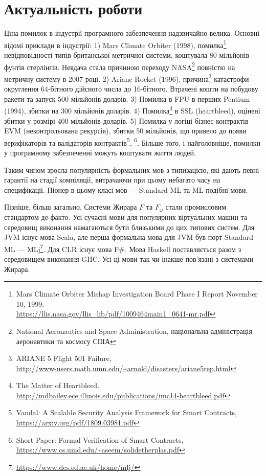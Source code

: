 \section{Актуальність роботи}
Ціна помилок в індустрії програмного забезпечення надзвичайно велика. Основні відомі приклади в індустрії:
1) Mars Climate Orbiter (1998),
   помилка\footnote{Mars Climate Orbiter Mishap Investigation Board Phase I Report November 10, 1999. \\
                    \url{https://llis.nasa.gov/llis_lib/pdf/1009464main1_0641-mr.pdf}}
   невідповідності типів британської метричної системи, коштувала 80 мільйонів фунтів стерлінгів.
   Невдача стала причиною переходу
   NASA\footnote{National Aeronautics and Space Administration, національна адміністрація аеронавтики та космосу США}
   повністю на метричну систему в 2007 році.
2) Ariane Rocket (1996),
   причина\footnote{ARIANE 5 Flight 501 Failure, \\
          \url{http://www-users.math.umn.edu/~arnold/disasters/ariane5rep.html}}
   катастрофи -- округлення 64-бітного дійсного числа до 16-бітного.
   Втрачені кошти на побудову ракети та запуск 500 мільйонів доларів.
3) Помилка в FPU в перших Pentium (1994), збитки на 300 мільйонів доларів.
4) Помилка\footnote{The Matter of Heartbleed. \\
                    \url{http://mdbailey.ece.illinois.edu/publications/imc14-heartbleed.pdf}}
   в SSL (heartbleed), оцінені збитки у розмірі 400 мільйонів доларів.
5) Помилка у логіці бізнес-контрактів EVM (неконтрольована рекурсія), збитки 50 мільйонів,
   що привело до появи верифікаторів та валідаторів
   контрактів\footnote{Vandal: A Scalable Security Analysis Framework for Smart Contracts, \\
                       \url{https://arxiv.org/pdf/1809.03981.pdf}},
             \footnote{Short Paper: Formal Verification of Smart Contracts, \\
                       \url{https://www.cs.umd.edu/~aseem/solidetherplas.pdf}}.
Більше того, і найголовніше, помилки у програмному забезпеченні можуть коштувати життя людей.

Таким чином зросла популярність формальних мов з типизацією, які дають певні гарантії
на стадії компіляції, витрачаючи при цьому небагато часу на специфікації. Піонер в цьому класі
мов --- Standard ML та ML-подібні мови.

Пізніше, більш загально, Системи Жирара $F$ та $F_\omega$ стали промисловим стандартом де-факто.
Усі сучасні мови для популярних віртуальних машин та середовищ виконання намагаються бути
близькими до цих типових систем. Для JVM існує мова Scala, але перша формальна мова для
JVM був порт Standard ML --- MLj\footnote{\url{https://www.dcs.ed.ac.uk/home/mlj/}}.
Для CLR існує мова F\#. Мова Haskell поставляється разом
з середовищем виконання GHC. Усі ці мови так чи інакше пов'язані з системами Жирара.

